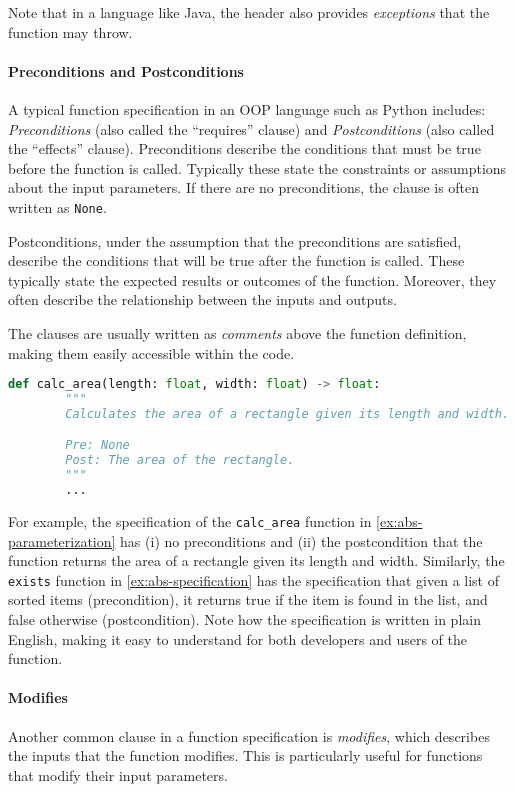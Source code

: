 \documentclass[oneside,11pt,dvipsnames]{book}
\begin{document}
Note that in a language like Java, the header also provides \emph{exceptions} that the function may throw.

\paragraph{Preconditions and Postconditions}

A typical function specification in an OOP language such as Python includes: \emph{Preconditions} (also called the ``requires'' clause) and \emph{Postconditions} (also called the ``effects'' clause). Preconditions describe the conditions that must be true before the function is called. Typically these state the constraints or assumptions about the input parameters. If there are no preconditions, the clause is often written as \texttt{None}.

Postconditions, under the assumption that the preconditions are satisfied, describe the conditions that will be true after the function is called. These typically state the expected results or outcomes of the function. Moreover, they often describe the relationship between the inputs and outputs.


The clauses are usually written as \emph{comments} above the function definition, making them easily accessible within the code.


\begin{lstlisting}[language=Python, keywordstyle=\color{blue}, commentstyle=\color{green!60!black}, stringstyle=\color{red}, basicstyle=\ttfamily\scriptsize]
    def calc_area(length: float, width: float) -> float:
        """
        Calculates the area of a rectangle given its length and width.

        Pre: None
        Post: The area of the rectangle.
        """
        ...
\end{lstlisting}

For example, the specification of the \texttt{calc\_area} function in \autoref{ex:abs-parameterization} has (i) no preconditions and (ii) the postcondition that the function returns the area of a rectangle given its length and width.  Similarly, the \texttt{exists} function in \autoref{ex:abs-specification} has the specification that given a list of sorted items (precondition), it returns true if the item is found in the list, and false otherwise (postcondition).  Note how the specification is written in plain English, making it easy to understand for both developers and users of the function. 


\paragraph{Modifies} Another common clause in a function specification is \emph{modifies}, which describes the inputs that the function modifies. This is particularly useful for functions that modify their input parameters. 
\end{document}
